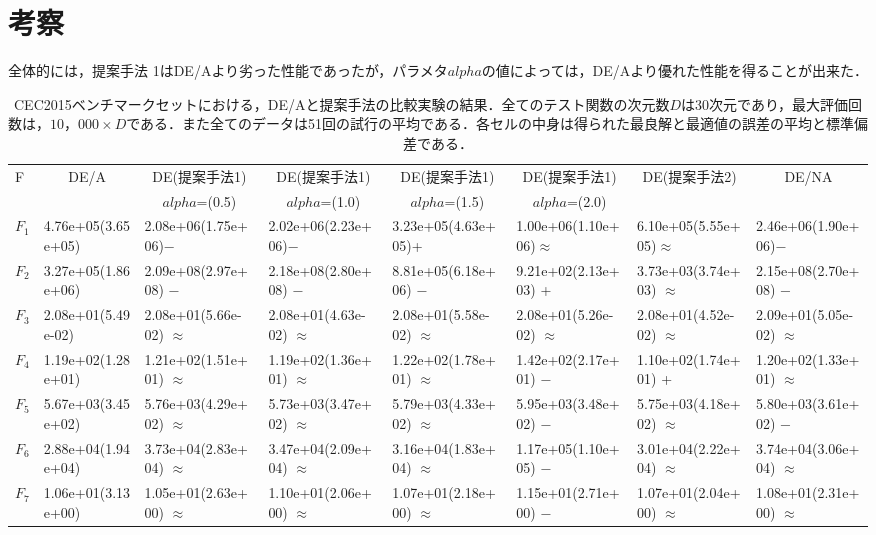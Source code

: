 \documentclass[a4paper,11pt,oneside,openany]{jsbook}
\begin{document}
\section{考察}
全体的には，提案手法 1はDE/Aより劣った性能であったが，パラメタ$alpha$の値によっては，DE/Aより優れた性能を得ることが出来た．

\newpage
\begin{landscape}
\begin{table}[!tbp]
\footnotesize
\caption{CEC2015ベンチマークセットにおける，DE/Aと提案手法の比較実験の結果．全てのテスト関数の次元数$D$は30次元であり，最大評価回数は，$10，000 \times D$である．また全てのデータは51回の試行の平均である．各セルの中身は得られた最良解と最適値の誤差の平均と標準偏差である．\label{ref-tb-values}} 
\begin{center}
\begin{tabular}{llllllll}
\hline\hline
\multicolumn{1}{l}{F}&\multicolumn{1}{c}{DE/A}&\multicolumn{1}{c}{DE(提案手法1)}&\multicolumn{1}{c}{DE(提案手法1)}&\multicolumn{1}{c}{DE(提案手法1)}&\multicolumn{1}{c}{DE(提案手法1)}&\multicolumn{1}{c}{DE(提案手法2)}&\multicolumn{1}{c}{DE/NA}\tabularnewline
&&\multicolumn{1}{c}{{\scriptsize $alpha$=(0.5)}}&\multicolumn{1}{c}{{\scriptsize $alpha$=(1.0)}}&\multicolumn{1}{c}{{\scriptsize $alpha$=(1.5)}}&\multicolumn{1}{c}{{\scriptsize $alpha$=(2.0)}}&&\tabularnewline
\hline
$F_{1}$&4.76e+05(3.65e+05)&2.08e+06(1.75e+06)−&2.02e+06(2.23e+06)−&3.23e+05(4.63e+05)+&1.00e+06(1.10e+06)$\approx$&6.10e+05(5.55e+05)$\approx$&2.46e+06(1.90e+06)−\tabularnewline
$F_{2}$&3.27e+05(1.86e+06)&2.09e+08(2.97e+08) −&2.18e+08(2.80e+08) −&8.81e+05(6.18e+06) −&9.21e+02(2.13e+03) +&3.73e+03(3.74e+03) $\approx$&2.15e+08(2.70e+08) −\tabularnewline
$F_{3}$&2.08e+01(5.49e-02)&2.08e+01(5.66e-02) $\approx$&2.08e+01(4.63e-02) $\approx$&2.08e+01(5.58e-02) $\approx$&2.08e+01(5.26e-02) $\approx$&2.08e+01(4.52e-02) $\approx$&2.09e+01(5.05e-02) $\approx$\tabularnewline
$F_{4}$&1.19e+02(1.28e+01)&1.21e+02(1.51e+01) $\approx$&1.19e+02(1.36e+01) $\approx$&1.22e+02(1.78e+01) $\approx$&1.42e+02(2.17e+01) −&1.10e+02(1.74e+01) +&1.20e+02(1.33e+01) $\approx$\tabularnewline
$F_{5}$&5.67e+03(3.45e+02)&5.76e+03(4.29e+02) $\approx$&5.73e+03(3.47e+02) $\approx$&5.79e+03(4.33e+02) $\approx$&5.95e+03(3.48e+02) −&5.75e+03(4.18e+02) $\approx$&5.80e+03(3.61e+02) −\tabularnewline
$F_{6}$&2.88e+04(1.94e+04)&3.73e+04(2.83e+04) $\approx$&3.47e+04(2.09e+04) $\approx$&3.16e+04(1.83e+04) $\approx$&1.17e+05(1.10e+05) −&3.01e+04(2.22e+04) $\approx$&3.74e+04(3.06e+04) $\approx$\tabularnewline
$F_{7}$&1.06e+01(3.13e+00)&1.05e+01(2.63e+00) $\approx$&1.10e+01(2.06e+00) $\approx$&1.07e+01(2.18e+00) $\approx$&1.15e+01(2.71e+00) −&1.07e+01(2.04e+00) $\approx$&1.08e+01(2.31e+00) $\approx$\tabularnewline

\end{tabular}
\end{center}
\end{table}
\end{landscape}
\end{document}
